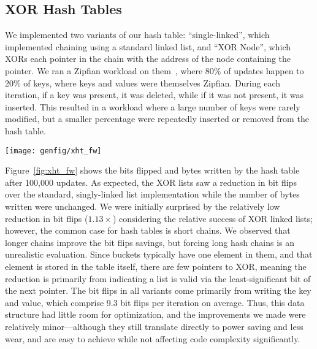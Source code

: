 \subsection{XOR Hash Tables}

We implemented two variants of our hash table: ``single-linked'', which
implemented chaining using a standard linked list, and
``XOR Node'', which
XORs each pointer in the chain with the address of the node containing the pointer.
We ran a Zipfian workload on them~\cite{zipf}, where 80\% of updates happen to
20\% of keys, where keys and values were
themselves Zipfian. During each iteration, if a key was present, it was deleted, while
if it was not present, it was inserted. This resulted in a workload where a
large number of keys were rarely modified, but a smaller percentage were
repeatedly inserted or removed from the hash table.

\begin{SCfigure}
	\centering
	\texttt{[image: genfig/xht\_fw]}
	\caption{Memory characteristics of XOR hash table variants under Zipfian
		workload.}
	\label{fig:xht_fw}
\end{SCfigure}


Figure~\ref{fig:xht_fw} shows the bits flipped and bytes written by the hash
table after 100,000 updates. As expected, the XOR lists saw a reduction in bit
flips over the standard, singly-linked list implementation while the number of
bytes written were unchanged. We were initially surprised by the relatively low
reduction in bit flips ($1.13\times$) considering the relative success of XOR linked
lists; however, the common case for hash tables is short chains. We observed
that longer chains improve the bit flips savings, but forcing long hash chains is
an unrealistic evaluation. Since buckets typically have one element in them, and
that element is stored in the table itself, there are few pointers to XOR,
meaning the reduction is primarily from indicating a list is valid via the
least-significant bit of the next pointer. The bit flips in all variants come
primarily from writing the key and value, which comprise 9.3 bit flips per
iteration on average. Thus, this data structure had little room for optimization,
and the improvements we made were relatively minor---although they still
translate directly to power saving and less wear, and are easy to achieve while
not affecting code complexity significantly.

